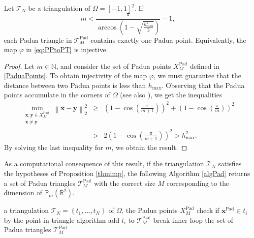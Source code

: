 \documentclass{svjour3}
\renewcommand{\P}{\mathbb{P}} %
\begin{document}
\begin{proposition}\label{thmimp}
Let $\mathcal{T}_N$ be a triangulation of $\Omega=[-1,1]^2$. If 
\begin{equation}\label{gencond}    m<\frac{\pi}{\arccos\left(1-\sqrt{\frac{h^2_{\max}}{2}}\right)}-1,
    \end{equation}
    each Padua triangle in $\mathcal{T}_M^{\mathrm{Pad}}$ contains exactly one Padua point. Equivalently, the map $\varphi$ in \eqref{eq:PPtoPT} is injective.
\end{proposition}
\begin{proof}
Let $m \in \mathbb{N}$, and consider the set of Padua points $X_M^{\mathrm{Pad}}$ defined in \eqref{PaduaPoints}. To obtain injectivity of the map $\varphi$, we must guarantee that the distance between two Padua points is less than $h_{\max}$. Observing that the Padua points accumulate in the corners of $ \Omega $ (see also \cite{Bos;2006:BLI}), we get the inequalities
\begin{eqnarray*}
\min_{\substack{\boldsymbol{x}, \boldsymbol{y} \in X_M^{\mathrm{Pad}} \\ \boldsymbol{x} \ne \boldsymbol{y} }} \left\lVert \boldsymbol{x} - \boldsymbol{y} \right\rVert_2^2 &\ge& \left( 1 - \cos\left( \frac{\pi}{m+1} \right) \right)^2+\left( 1 - \cos\left( \frac{\pi}{m} \right) \right)^2\\ &>&2\left( 1 - \cos\left( \frac{\pi}{m+1} \right) \right)^2 > h_{\max}^2 .
\end{eqnarray*}
By solving the last inequality for $ m $, we obtain the result.
\end{proof}

As a computational consequence of this result, if the triangulation $ \mathcal{T}_N $ satisfies the hypotheses of Proposition \ref{thmimp}, the following Algorithm \ref{algPad} returns a set of Padua triangles $ \mathcal{T}^{\mathrm{Pad}}_M $ with the correct size $M$ corresponding to the dimension of $\P_m(\mathbb{R}^2)$.

\begin{algorithm}[h!]
	\caption{Extraction of Padua triangles}
	\begin{algorithmic}[1]
		\Require a triangulation $\mathcal{T}_N =\left\{ t_1,\dots,t_N \right\} $ of $ \Omega $, the Padua points $ X_M^{\mathrm{Pad}} $	
                \State check if $\boldsymbol{x}^{\mathrm{Pad}} \in t_i$ by the point-in-triangle algorithm
				\State add $ t_i $ to $\mathcal{T}^{\mathrm{Pad}}_M$
				\State break inner loop
				\EndIf
			\EndFor
			\EndFor
    \Ensure the set of Padua triangles $\mathcal{T}^{\mathrm{Pad}}_M$
	\end{algorithmic}
	\label{algPad}
\end{algorithm}
\end{document}
